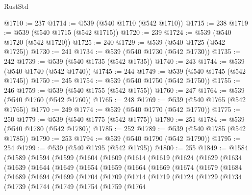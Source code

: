 \begin{lexlean}{RustStd}
\begin{coremodule}
@1710 := 237
@1714 := @539 (@540 @1710 (@542 @1710))
@1715 := 238
@1719 := @539 (@540 @1715 (@542 @1715))
@1720 := 239
@1724 := @539 (@540 @1720 (@542 @1720))
@1725 := 240
@1729 := @539 (@540 @1725 (@542 @1725))
@1730 := 241
@1734 := @539 (@540 @1730 (@542 @1730))
@1735 := 242
@1739 := @539 (@540 @1735 (@542 @1735))
@1740 := 243
@1744 := @539 (@540 @1740 (@542 @1740))
@1745 := 244
@1749 := @539 (@540 @1745 (@542 @1745))
@1750 := 245
@1754 := @539 (@540 @1750 (@542 @1750))
@1755 := 246
@1759 := @539 (@540 @1755 (@542 @1755))
@1760 := 247
@1764 := @539 (@540 @1760 (@542 @1760))
@1765 := 248
@1769 := @539 (@540 @1765 (@542 @1765))
@1770 := 249
@1774 := @539 (@540 @1770 (@542 @1770))
@1775 := 250
@1779 := @539 (@540 @1775 (@542 @1775))
@1780 := 251
@1784 := @539 (@540 @1780 (@542 @1780))
@1785 := 252
@1789 := @539 (@540 @1785 (@542 @1785))
@1790 := 253
@1794 := @539 (@540 @1790 (@542 @1790))
@1795 := 254
@1799 := @539 (@540 @1795 (@542 @1795))
@1800 := 255
@1849 := @1584
    (@1589
      (@1594
        (@1599
          (@1604
            (@1609
              (@1614
                (@1619
                  (@1624
                    (@1629
                      (@1634
                        (@1639
                          (@1644
                            (@1649
                              (@1654
                                (@1659
                                  (@1664
                                    (@1669
                                      (@1674
                                        (@1679
                                          (@1684
                                            (@1689
                                              (@1694
                                                (@1699
                                                  (@1704
                                                    (@1709
                                                      (@1714
                                                        (@1719
                                                          (@1724
                                                            (@1729
                                                              (@1734
                                                                (@1739
                                                                  (@1744
                                                                    (@1749
                                                                      (@1754
                                                                        (@1759
                                                                          (@1764

\end{coremodule}
\end{lexlean}
